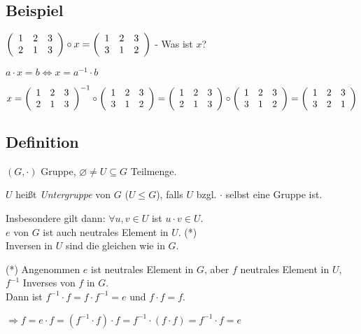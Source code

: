  
 \subsection{Beispiel}
 $
 \aMatrix{ccc}{
 	1 & 2 & 3 \\
 	2 & 1 & 3
 	}\circ
 	x =
 \aMatrix{ccc}{
 	1 & 2 & 3 \\
 	3 & 1 & 2
 	}
 	$
 - Was ist $x$?
 
 $ a \cdot x = b \Leftrightarrow x=a^{-1} \cdot b$
 
 $
 x =
  \aMatrix{ccc}{
  	1 & 2 & 3 \\
  	2 & 1 & 3
  }^{-1}\circ
 \aMatrix{ccc}{
 	1 & 2 & 3 \\
 	3 & 1 & 2
 } = 
  \aMatrix{ccc}{
  	1 & 2 & 3 \\
  	2 & 1 & 3
  }\circ
  \aMatrix{ccc}{
  	1 & 2 & 3 \\
  	3 & 1 & 2
  } =
  \aMatrix{ccc}{
  	1 & 2 & 3 \\
  	3 & 2 & 1
  }
  $

\subsection[Definition: Untergruppe]{Definition}

$(G,\cdot)$ Gruppe, $\varnothing \neq U \subseteq G$ Teilmenge.

$U$ heißt \emph{Untergruppe} von $G$ ($U\leqslant G$), falls $U$ bzgl. $\cdot$ selbst eine Gruppe ist.

Insbesondere gilt dann:
$\forall u,v \in U$ ist $u \cdot v \in  U$.\\
$e$ von $G$ ist auch neutrales Element in $U$. (*)\\
Inversen in $U$ sind die gleichen wie in $G$.

(*) Angenommen $e$ ist neutrales Element in $G$, aber $f$ neutrales Element in $U$, $f^{-1}$ Inverses von $f$ in $G$.\\
Dann ist $f^{-1} \cdot f= f \cdot f^{-1} = e$ und $f\cdot f = f$.

$\Rightarrow f = e \cdot f = (f^{-1} \cdot f) \cdot f = f^{-1} \cdot (f \cdot f) = f^{-1} \cdot f = e$

